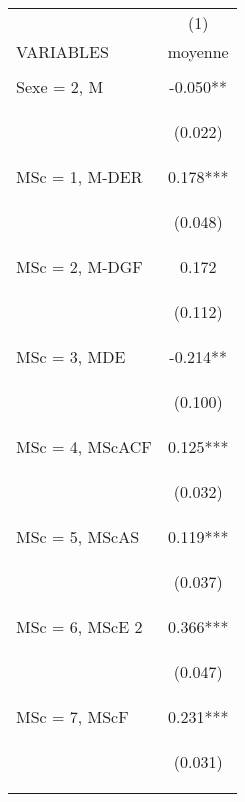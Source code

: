 \documentclass{article} %
\begin{document}
\begin{table}[H]
\begin{center}
\begin{tabular}{lc} \hline
 & (1) \\
VARIABLES & moyenne \\ \hline
\vspace{4pt} & \begin{footnotesize}\end{footnotesize} \\
Sexe = 2, M & -0.050** \\
\vspace{4pt} & \begin{footnotesize}(0.022)\end{footnotesize} \\
MSc = 1, M-DER & 0.178*** \\
\vspace{4pt} & \begin{footnotesize}(0.048)\end{footnotesize} \\
MSc = 2, M-DGF & 0.172 \\
\vspace{4pt} & \begin{footnotesize}(0.112)\end{footnotesize} \\
MSc = 3, MDE & -0.214** \\
\vspace{4pt} & \begin{footnotesize}(0.100)\end{footnotesize} \\
MSc = 4, MScACF & 0.125*** \\
\vspace{4pt} & \begin{footnotesize}(0.032)\end{footnotesize} \\
MSc = 5, MScAS & 0.119*** \\
\vspace{4pt} & \begin{footnotesize}(0.037)\end{footnotesize} \\
MSc = 6, MScE 2 & 0.366*** \\
\vspace{4pt} & \begin{footnotesize}(0.047)\end{footnotesize} \\
MSc = 7, MScF & 0.231*** \\
\vspace{4pt} & \begin{footnotesize}(0.031)\end{footnotesize} \\

\end{tabular}
\end{center}
\end{table}
\end{document}
